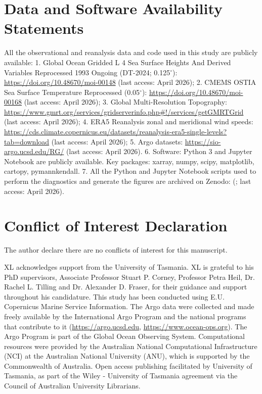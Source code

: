 \documentclass[draft]{agujournal2019}
\begin{document}
\section*{Data and Software Availability Statements}

All the observational and reanalysis data and code used in this study are publicly available:
1. Global Ocean Gridded L 4 Sea Surface Heights And Derived Variables Reprocessed 1993 Ongoing (DT-2024; 0.125$^{\circ}$): \url{https://doi.org/10.48670/moi-00148} (last access: April 2026);
2. CMEMS OSTIA Sea Surface Temperature Reprocessed (0.05$^{\circ}$): \url{https://doi.org/10.48670/moi-00168} (last access: April 2026);
3. Global Multi-Resolution Topography: \url{https://www.gmrt.org/services/gridserverinfo.php#!/services/getGMRTGrid} (last access: April 2026);
4. ERA5 Reanalysis zonal and meridional wind speeds: \url{https://cds.climate.copernicus.eu/datasets/reanalysis-era5-single-levels?tab=download} (last access: April 2026);
5. Argo datasets: \url{https://sio-argo.ucsd.edu/RG/} (last access: April 2026).
6. Software: Python 3 and Jupyter Notebook are publicly available. Key packages: xarray, numpy, scipy, matplotlib, cartopy, pymannkendall.
7. All the Python and Jupyter Notebook scripts used to perform the diagnostics and generate the figures are archived on Zenodo: \url{} (; last access: April 2026).



\section*{Conflict of Interest Declaration}

The author declare there are no conflicts of interest for this manuscript.



\acknowledgments

XL acknowledges support from the University of Tasmania.
XL is grateful to his PhD supervisors, Associate Professor Stuart P. Corney, Professor Petra Heil, Dr. Rachel L. Tilling and Dr. Alexander D. Fraser, for their guidance and support throughout his candidature.
This study has been conducted using E.U. Copernicus Marine Service Information.
The Argo data were collected and made freely available by the International Argo Program and the national programs that contribute to it (\url{https://argo.ucsd.edu}, \url{https://www.ocean-ops.org}). The Argo Program is part of the Global Ocean Observing System.
Computational resources were provided by the Australian National Computational Infrastructure (NCI) at the Australian National University (ANU), which is supported by the Commonwealth of Australia.
Open access publishing facilitated by University of Tasmania, as part of the Wiley - University of Tasmania agreement via the Council of Australian University Librarians.





\end{document}
